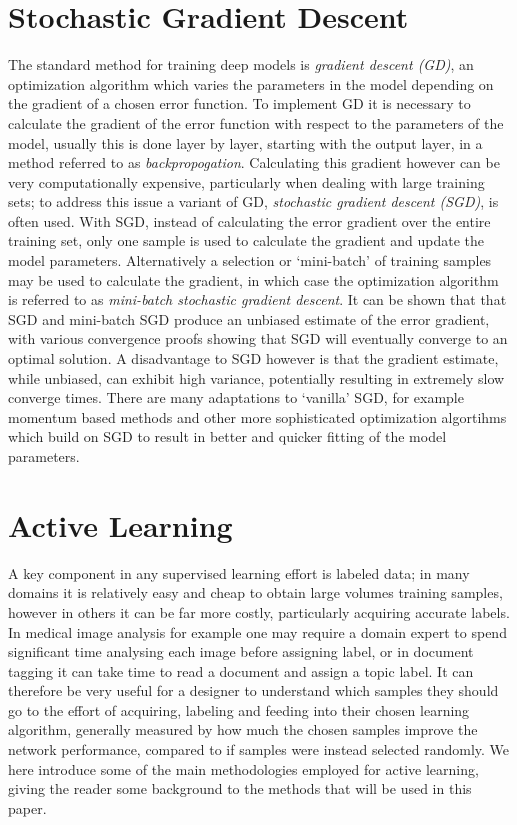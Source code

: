 \section{Stochastic Gradient Descent}
The standard method for training deep models is \textit{gradient descent (GD)}, an optimization algorithm which varies the parameters in the model depending on the gradient of a chosen error function. To implement GD it is necessary to calculate the gradient of the error function with respect to the parameters of the model, usually this is done layer by layer, starting with the output layer, in a method referred to as \textit{backpropogation}. Calculating this gradient however can be very computationally expensive, particularly when dealing with large training sets; to address this issue a variant of GD, \textit{stochastic gradient descent (SGD)}, is often used. With SGD, instead of calculating the error gradient over the entire training set, only one sample is used to calculate the gradient and update the model parameters. Alternatively a selection or `mini-batch' of training samples may be used to calculate the gradient, in which case the optimization algorithm is referred to as \textit{mini-batch stochastic gradient descent}. It can be shown that that SGD and mini-batch SGD produce an unbiased estimate of the error gradient, with various convergence proofs showing that SGD will eventually converge to an optimal solution. A disadvantage to SGD however is that the gradient estimate, while unbiased, can exhibit high variance, potentially resulting in extremely slow converge times. There are many adaptations to `vanilla' SGD, for example momentum based methods and other more sophisticated optimization algortihms which build on SGD to result in better and quicker fitting of the model parameters.

\section{Active Learning}\label{Background_ActiveLearning}
A key component in any supervised learning effort is labeled data; in many domains it is relatively easy and cheap to obtain large volumes training samples, however in others it can be far more costly, particularly acquiring accurate labels. In medical image analysis for example one may require a domain expert to spend significant time analysing each image before assigning label, or in document tagging it can take time to read a document and assign a topic label. It can therefore be very useful for a designer to understand which samples they should go to the effort of acquiring, labeling and feeding into their chosen learning algorithm, generally measured by how much the chosen samples improve the network performance, compared to if samples were instead selected randomly. We here introduce some of the main methodologies employed for active learning, giving the reader some background to the methods that will be used in this paper.

